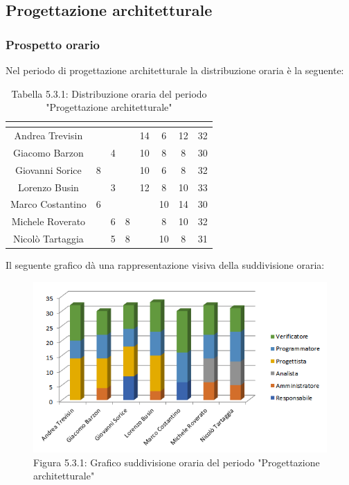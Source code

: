 \subsection{Progettazione architetturale}

\subsubsection{Prospetto orario}
Nel periodo di progettazione architetturale la distribuzione oraria è la seguente:

\renewcommand{\arraystretch}{1.5}
\begin{table}[H]
\begin{center}
\begin{tabular}{|c|c|c|c|c|c|c|c|}
\hline
\rowcolor{title_row}
\textbf{\color{title_text}{Nome}} & \textbf{\color{title_text}{Resp.}} & \textbf{\color{title_text}{Ammi.}} & \textbf{\color{title_text}{Analist.}} & \textbf{\color{title_text}{Progett.}} & \textbf{\color{title_text}{Program.}} & \textbf{\color{title_text}{Verific.}} & \textbf{\color{title_text}{Totale}} \\ \hline
Andrea Trevisin  & & & & 14 & 6 & 12 & 32 \\ \hline
Giacomo Barzon   &  & 4 &  & 10 & 8 & 8 & 30\\ \hline
Giovanni Sorice  & 8 &  &  & 10 & 6 & 8 & 32\\ \hline
Lorenzo Busin    &  & 3  &  & 12 & 8 & 10 & 33\\ \hline
Marco Costantino & 6 &  &  &  & 10 & 14 & 30\\ \hline
Michele Roverato &  & 6 & 8 &  & 8 & 10 & 32\\ \hline
Nicolò Tartaggia &  & 5  & 8 &  & 10 & 8 & 31\\ \hline
\end{tabular}
\caption{Tabella 5.3.1: Distribuzione oraria del periodo "Progettazione architetturale"\label{}}
\end{center}
\end{table}
\renewcommand{\arraystretch}{1}

Il seguente grafico dà una rappresentazione visiva della suddivisione oraria: \\
\begin{figure} [H]
	\centering
	\includegraphics[scale=1]{Res/ExcelGrafici/Grafici/ProgettazioneOre.png}
	\caption{Figura 5.3.1: Grafico suddivisione oraria del periodo "Progettazione architetturale"}\label{}
\end{figure}


